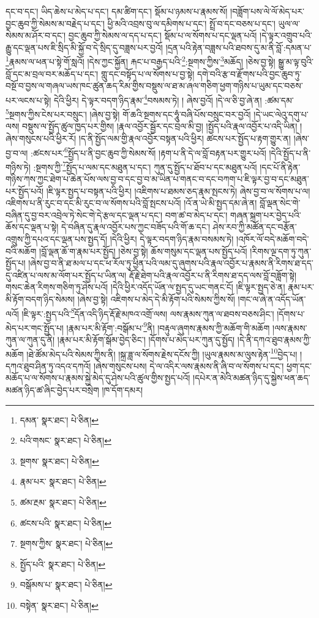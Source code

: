 དང་བ་དང་། ཡིད་ཆེས་པ་མེད་པ་དང་། དམ་ཚིག་དང་། སྡོམ་པ་ཉམས་པ་རྣམས་སོ། །བཟློག་པས་ལེ་ལོ་མེད་པར་བྱང་ཆུབ་ཀྱི་སེམས་མ་བརྗེད་པ་དང་། ཕྱི་མའི་འབྲས་བུ་ལ་དམིགས་པ་དང་། སྤྲོ་བ་དང་བཅས་པ་དང་། ཡུལ་ལ་སེམས་མ་ཤོར་བ་དང་། བྱང་ཆུབ་ཀྱི་སེམས་ལ་དད་པ་དང་། སྡོམ་པ་ལ་སོགས་པ་དང་ལྡན་པའོ། །དེ་ལྟར་འགྲུབ་པའི་རྒྱུ་དང་ལྡན་པས་ཇི་སྲིད་མི་སྐྱོ་བ་དེ་སྲིད་དུ་བཟླས་པར་བྱའོ། །དྲན་པའི་རྟེན་བཟླས་པའི་ཐབས་དུ་མ་ནི་བློ་:དམན་པ་\footnote{དམན་  སྣར་ཐང་།  པེ་ཅིན། }རྣམས་ལ་ཕན་པ་སྟེ་གོ་སླའོ། །དེས་ཀྱང་སྐྱོན། རྐང་པ་བརྒྱད་པའི་\footnote{པའི་གསང་  སྣར་ཐང་།  པེ་ཅིན། }:སྔགས་ཀྱིས་\footnote{སྔགས་  སྣར་ཐང་།  པེ་ཅིན། }མཆོད། །ཅེས་བྱ་སྟེ། སྒྱུ་མ་ལྟ་བུའི་བློ་དང་མ་བྲལ་བར་མཆོད་པ་དང་། གླུ་དང་བསྟོད་པ་ལ་སོགས་པ་བྱ་སྟེ། དགེ་བའི་རྩ་བ་རྫོགས་པའི་བྱང་ཆུབ་ཏུ་བསྔོ་བ་བྱས་ལ་གཞལ་ཡས་ཁང་ཚུན་ཆད་རིམ་གྱིས་བསྡུས་ལ་ཐ་མ་ཞལ་གཅིག་ཕྱག་གཉིས་པ་ཡུམ་དང་བཅས་པར་ལངས་པ་སྟེ། དེའི་ཕྱིར། དེ་ལྟར་བདག་ཉིད་རྣམ་\footnote{རྣམ་པར་  སྣར་ཐང་།  པེ་ཅིན། }བསམས་ཏེ། །
ཞེས་བྱའོ། །དེ་ལ་ཅི་བྱ་ཞེ་ན། :ཚམ་དམ་\footnote{ཚམ་རྔམ་  སྣར་ཐང་།  པེ་ཅིན། }སྔགས་ཀྱིས་ངེས་པར་བསྲུང་། །ཞེས་བྱ་སྟེ། གོ་ཆའི་སྔགས་དང་ཧཱུཾ་བཞི་པོས་བསྲུང་བར་བྱའོ། །དེ་ཡང་ལེའུ་དགུ་པ་ལས། བསྡུས་ལ་སྤྱོད་ཚུལ་ཁྱད་པར་གྱིས། །རྣལ་འབྱོར་སྦྱོར་དང་བྲལ་མི་བྱ། །སྤྱོད་པའི་རྣལ་འབྱོར་པ་འདི་ཡིན། །ཞེས་གསུངས་པའི་ཕྱིར་རོ། །ད་ནི་སྤྱོད་ལམ་གྱི་རྣལ་འབྱོར་བསྟན་པའི་ཕྱིར། ཚངས་པར་སྤྱོད་པ་རྟག་གྱུར་ན། །ཞེས་བྱ་བ་ལ། :ཚངས་པར་\footnote{ཚངས་པའི་  སྣར་ཐང་།  པེ་ཅིན། }སྤྱོད་པ་ནི་བྱང་ཆུབ་ཀྱི་སེམས་སོ། །རྟག་པ་ནི་དེ་ལ་བློ་བརྟན་པར་གྱུར་པའོ། །དེའི་སྤྱོད་པ་ནི་གཉིས་ཏེ། :སྔགས་ཀྱི་\footnote{སྔགས་ཀྱིས་  སྣར་ཐང་།  པེ་ཅིན། }སྤྱོད་པ་ལམ་དང་མཐུན་པ་དང་། ཀུན་དུ་སྤྱོད་པ་ཐོབ་པ་དང་མཐུན་པའོ། །དང་པོ་ནི་རྟེན་གཉིས་ཀས་ཀྱང་ཐེག་པ་ཆེན་པོས་ལས་བྱ་བ་དང་བྱ་བ་མ་ཡིན་པ་གནང་བ་དང་བཀག་པ་ཇི་ལྟར་བྱ་བ་དང་མཐུན་པར་སྤྱོད་པའོ། །ཇི་ལྟར་སྤྱད་པ་བསྟན་པའི་ཕྱིར། །འཇིགས་པ་ཐམས་ཅད་རྣམ་སྤངས་ཏེ། ཞེས་བྱ་བ་ལ་སོགས་པ་ལ། འཇིགས་པ་ནི་རུང་བ་དང་མི་རུང་བ་ལ་སོགས་པའི་བློ་སྤངས་པའོ། །འོ་ན་ཡེ་མི་སྤྱད་དམ་ཞེ་ན། བློ་ལྡན་སེང་གེ་བཞིན་དུ་བྱ་བར་འབྲེལ་ཏེ་སེང་གེ་དེ་རྩལ་དང་ལྡན་པ་དང་། བག་ཚ་བ་མེད་པ་དང་། གཞན་སྐྲག་པར་བྱེད་པའི་ཆོས་དང་ལྡན་པ་སྟེ། དེ་བཞིན་དུ་རྣལ་འབྱོར་པས་ཀྱང་བཟོད་པའི་གོ་ཆ་དང་། ཤེས་རབ་ཀྱི་མཚོན་དང་བརྩོན་འགྲུས་ཀྱི་དཔའ་དང་ལྡན་པས་སྤྱད་དོ། །དེའི་ཕྱིར། དེ་ལྟར་བདག་ཉིད་རྣམ་བསམས་ཏེ། །འཁོར་ལོ་བདེ་མཆོག་བདེ་བའི་མཆོག །བློ་ལྡན་ཆོ་ག་རྣམ་པར་སྤྱོད། །ཅེས་བྱ་སྟེ། ཆོས་གསུམ་དང་ལྡན་པས་སྤྱོད་པའོ། །རིགས་ལྔ་དག་ཏུ་ཀུན་སྤྱོད་པ། །ཞེས་བྱ་བ་ནི་ཐ་མལ་པ་དང་ཕ་རོལ་ཏུ་ཕྱིན་པའི་ལམ་དུ་ཞུགས་པའི་རྣལ་འབྱོར་པ་རྣམས་ནི་རིགས་ཐ་དད་དུ་འཛིན་པ་ལས་མ་ལོག་པར་སྤྱོད་པ་ཡིན་ལ། རྡོ་རྗེ་ཐེག་པའི་རྣལ་འབྱོར་པ་ནི་རིགས་ཐ་དད་ལས་བློ་བཟློག་སྟེ། གསང་ཆེན་རིགས་གཅིག་ཏུ་ཤེས་པའོ། །དེའི་ཕྱིར་འདོད་ཡོན་ལ་སྤྱད་དུ་ཡང་གནང་ངོ། །ཇི་ལྟར་སྤྱད་ཅེ་ན། རྣམ་པར་མི་རྟོག་བདག་ཉིད་སེམས། །ཞེས་བྱ་སྟེ། འཇིགས་པ་མེད་དེ་མི་རྟོག་པའི་སེམས་ཀྱིས་སོ། །གང་ལ་ཞེ་ན་འདོད་ཡོན་ལའོ། །ཇི་ལྟར་:སྤྱད་པའི་\footnote{སྤྱོད་པའི་  སྣར་ཐང་།  པེ་ཅིན། }དོན་འདི་ཉིད་རྡོ་རྗེ་མཁའ་འགྲོ་ལས། ལས་རྣམས་ཀུན་ལ་ཐབས་བཅས་ཤིང་། །དོགས་པ་མེད་པར་གང་སྤྱོད་པ། །རྣམ་པར་མི་རྟོག་:བསྒོམ་པ་\footnote{བསྒོམས་པ་  སྣར་ཐང་།  པེ་ཅིན། }ནི། །བརྟུལ་ཞུགས་རྣམས་ཀྱི་མཆོག་གི་མཆོག །ལས་རྣམས་ཀུན་ལ་ཀུན་དུ་ནི། །རྣམ་པར་མི་རྟོག་སྒོམ་བྱེད་ཅིང་། །དོགས་པ་མེད་པར་ཀུན་དུ་སྤྱོད། །དེ་ནི་དཀའ་ཐུབ་རྣམས་ཀྱི་མཆོག །ཐེ་ཚོམ་མེད་པའི་སེམས་ཀྱིས་ནི། །སྐྲ་ཟླ་ལ་སོགས་རྗེས་དངོས་ཀྱི། །ཡུལ་རྣམས་མ་ལུས་རྟེན་\footnote{བསྟེན་  སྣར་ཐང་།  པེ་ཅིན། }བྱེད་པ། །དཀའ་ཐུབ་ཤིན་ཏུ་འདའ་དཀའོ། །ཞེས་གསུངས་པས། དེ་ལ་འདིར་ལས་རྣམས་ནི་ཞི་བ་ལ་སོགས་པ་དང་། ཕྱག་དང་མཆོད་པ་ལ་སོགས་པ་རྣམས་སྐྱེ་མེད་དུ་ཤེས་པའི་ཚུལ་གྱིས་སྤྱད་པའོ། །དཔེར་ན་མེའི་མཚན་ཉིད་དུ་སྐྱེས་ཕན་ཆད་མཚན་ཉིད་ཚ་ཞིང་བྱེད་པར་བསྲེག །ཁ་དོག་དམར། 